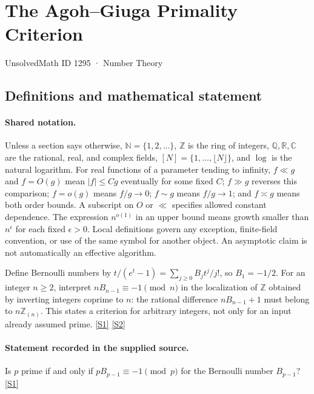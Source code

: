 \documentclass[11pt,a4paper]{article}
\newcommand{\N}{\mathbb{N}}
\newcommand{\Z}{\mathbb{Z}}
\newcommand{\Q}{\mathbb{Q}}
\newcommand{\R}{\mathbb{R}}
\newcommand{\C}{\mathbb{C}}
\newcommand{\sref}[2]{\hyperlink{source:#1:#2}{[S#2]}}
\begin{document}

\setcounter{section}{1294}

\section{The Agoh--Giuga Primality Criterion}\label{1295}

{\small\sffamily UnsolvedMath ID 1295 · Number Theory}

\subsection{Definitions and mathematical statement}

\paragraph{Shared notation.}Unless a section says otherwise, $\N=\{1,2,\ldots\}$,
$\Z$ is the ring of integers, $\Q,\R,\C$ are the rational, real, and complex
fields, $[N]=\{1,\ldots,\lfloor N\rfloor\}$, and $\log$ is the natural
logarithm. For real functions of a parameter tending to infinity,
$f\ll g$ and $f=O(g)$ mean $|f|\leq Cg$ eventually for some fixed $C$;
$f\gg g$ reverses this comparison; $f=o(g)$ means $f/g\to0$;
$f\sim g$ means $f/g\to1$; and $f\asymp g$ means both order bounds.
A subscript on $O$ or $\ll$ specifies allowed constant dependence.
The expression $n^{o(1)}$ in an upper bound means growth smaller than
$n^\epsilon$ for each fixed $\epsilon>0$. Local definitions govern any
exception, finite-field convention, or use of the same symbol for another
object. An asymptotic claim is not automatically an effective algorithm.



Define Bernoulli numbers by $t/(e^t-1)=\sum_{j\geq0}B_jt^j/j!$, so $B_1=-1/2$. For an integer $n\geq2$, interpret $nB_{n-1}\equiv-1\pmod n$ in the localization of $\Z$ obtained by inverting integers coprime to $n$: the rational difference $nB_{n-1}+1$ must belong to $n\Z_{(n)}$. This states a criterion for arbitrary integers, not only for an input already assumed prime. \sref{1295}{1} \sref{1295}{2}

\paragraph{Statement recorded in the supplied source.}
Is $p$ prime if and only if $pB_{p-1} \equiv -1 \pmod{p}$ for the Bernoulli number $B_{p-1}$? \sref{1295}{1}
\end{document}
